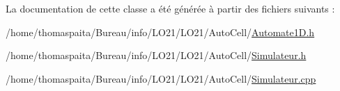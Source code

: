 La documentation de cette classe a été générée à partir des fichiers suivants \+:\begin{DoxyCompactItemize}
\item 
/home/thomaspaita/\+Bureau/info/\+L\+O21/\+L\+O21/\+Auto\+Cell/\hyperlink{_automate1_d_8h}{Automate1\+D.\+h}\item 
/home/thomaspaita/\+Bureau/info/\+L\+O21/\+L\+O21/\+Auto\+Cell/\hyperlink{_simulateur_8h}{Simulateur.\+h}\item 
/home/thomaspaita/\+Bureau/info/\+L\+O21/\+L\+O21/\+Auto\+Cell/\hyperlink{_simulateur_8cpp}{Simulateur.\+cpp}\end{DoxyCompactItemize}
